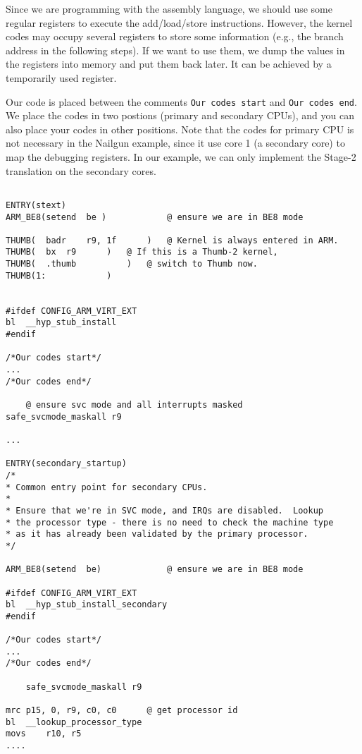 Since we are programming with the assembly language, we should use some regular registers to execute the add/load/store instructions. However, the kernel codes may occupy several registers to store some information (e.g., the branch address in the following steps). If we want to use them, we dump the values in the registers into memory and put them back later. It can be achieved by a temporarily used register.



Our code is placed between the comments \texttt{Our codes start} and \texttt{Our codes end}. We place the codes in two postions (primary and secondary CPUs), and you can also place your codes in other positions.
Note that the codes for primary CPU is not necessary in the Nailgun example, since it use core 1 (a secondary core) to map the debugging registers. In our example, we can only implement the Stage-2 translation on the secondary cores.

\begin{lstlisting}

ENTRY(stext)
ARM_BE8(setend	be )			@ ensure we are in BE8 mode

THUMB(	badr	r9, 1f		)	@ Kernel is always entered in ARM.
THUMB(	bx	r9		)	@ If this is a Thumb-2 kernel,
THUMB(	.thumb			)	@ switch to Thumb now.
THUMB(1:			)


#ifdef CONFIG_ARM_VIRT_EXT
bl	__hyp_stub_install
#endif

/*Our codes start*/
...
/*Our codes end*/

	@ ensure svc mode and all interrupts masked
safe_svcmode_maskall r9

...

ENTRY(secondary_startup)
/*
* Common entry point for secondary CPUs.
*
* Ensure that we're in SVC mode, and IRQs are disabled.  Lookup
* the processor type - there is no need to check the machine type
* as it has already been validated by the primary processor.
*/

ARM_BE8(setend	be)				@ ensure we are in BE8 mode

#ifdef CONFIG_ARM_VIRT_EXT
bl	__hyp_stub_install_secondary
#endif

/*Our codes start*/
...
/*Our codes end*/

	safe_svcmode_maskall r9

mrc	p15, 0, r9, c0, c0		@ get processor id
bl	__lookup_processor_type
movs	r10, r5	
....

\end{lstlisting}


